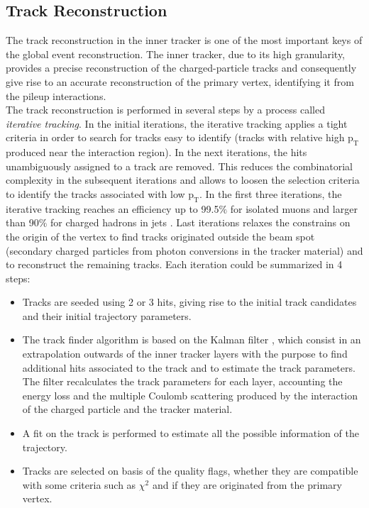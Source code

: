 \subsection{Track Reconstruction}
\label{subsec:TrackReco}
The track reconstruction in the inner tracker is one of the most important keys of the global event reconstruction. The inner tracker, due to its
high granularity, provides a precise reconstruction of the charged-particle tracks and consequently give rise to an accurate reconstruction 
of the primary vertex, identifying it from the pileup interactions. \\

The track reconstruction is performed in several steps by a process called \textit{iterative tracking}. In the initial iterations, 
the iterative tracking applies a tight criteria in order to search for tracks easy to identify (tracks 
with relative high $\textrm{p}_{\textrm{T}}$ produced near the interaction region). In the next iterations, the hits 
unambiguously assigned to a track are removed. This reduces the combinatorial complexity in the subsequent iterations 
and allows to loosen the selection criteria to identify the tracks associated with low $\textrm{p}_{\textrm{T}}$. In the first three iterations, 
the iterative tracking reaches an efficiency up to 99.5$\%$ for isolated muons and larger than 90$\%$ for 
charged hadrons in jets \cite{CMS-PAS-PFT-09-001}. Last iterations relaxes the constrains on the origin of the vertex 
to find tracks originated outside the beam spot (secondary charged particles from photon conversions in the tracker material) 
and to reconstruct the remaining tracks. Each iteration could be summarized in 4 steps:\\

\begin{itemize}
 \item Tracks are seeded using 2 or 3 hits, giving rise to the initial track candidates and their initial trajectory parameters.
 \item The track finder algorithm is based on the Kalman filter \cite{Fruhwirth:1987fm}, which consist in an extrapolation outwards of the inner 
       tracker layers with the purpose to find additional hits associated to the track and to estimate the track 
       parameters. The filter recalculates the track parameters for each layer, accounting the energy loss and the 
       multiple Coulomb scattering produced by the interaction of the charged particle and the tracker material.
 \item A fit on the track is performed to estimate all the possible information of the trajectory.
 \item Tracks are selected on basis of the quality flags, whether they are compatible with some 
 criteria such as $\chi^{2}$ and if they are originated from the primary vertex.
\end{itemize}

